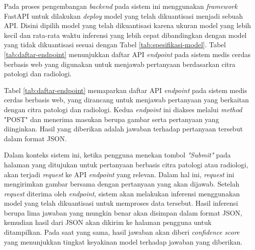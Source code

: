 \par Pada proses pengembangan \textit{backend} pada sistem ini menggunakan \textit{framework} FastAPI untuk dilakukan \textit{deploy} model yang telah dikuantisasi menjadi sebuah API. Disini dipilih model yang telah dikuantisasi karena ukuran model yang lebih kecil dan rata-rata waktu inferensi yang lebih cepat dibandingkan dengan model yang tidak dikuantisasi sesuai dengan Tabel \ref{tab:spesifikasi-model}. Tabel \ref{tab:daftar-endpoint} menunjukkan daftar API \textit{endpoint} pada sistem medis cerdas berbasis web yang digunakan untuk menjawab pertanyaan berdasarkan citra patologi dan radiologi.


\begin{table}[H]
  \centering
  \caption{Daftar API \textit{endpoint} pada sistem medis cerdas berbasis web}
  \label{tab:daftar-endpoint}
  \end{table}

  Tabel \ref{tab:daftar-endpoint} memaparkan daftar API \textit{endpoint} pada sistem medis cerdas berbasis web, yang dirancang untuk menjawab pertanyaan yang berkaitan dengan citra patologi dan radiologi. Kedua \textit{endpoint} ini diakses melalui \textit{method} "POST" dan menerima masukan berupa gambar serta pertanyaan yang diinginkan. Hasil yang diberikan adalah jawaban terhadap pertanyaan tersebut dalam format JSON.

  Dalam konteks sistem ini, ketika pengguna menekan tombol \textit{"Submit"} pada halaman yang ditujukan untuk pertanyaan berbasis citra patologi atau radiologi, akan terjadi \textit{request} ke API \textit{endpoint} yang relevan. Dalam hal ini, \textit{request} ini mengirimkan gambar bersama dengan pertanyaan yang akan dijawab. Setelah \textit{request} diterima oleh \textit{endpoint}, sistem akan melakukan inferensi menggunakan model yang telah dikuantisasi untuk memproses data tersebut. Hasil inferensi berupa lima jawaban yang mungkin benar akan disimpan dalam format JSON, kemudian hasil dari JSON akan dikirim ke halaman pengguna untuk ditampilkan. Pada saat yang sama, hasil jawaban akan diberi \textit{confidence score} yang menunjukkan tingkat keyakinan model terhadap jawaban yang diberikan. 

